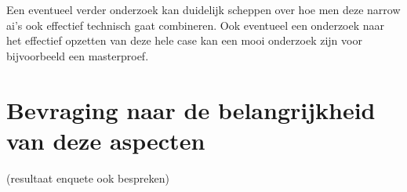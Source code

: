 Een eventueel verder onderzoek kan duidelijk scheppen over hoe men deze narrow ai's ook effectief technisch gaat combineren. Ook eventueel een onderzoek naar het effectief opzetten van deze hele case kan een mooi onderzoek zijn voor bijvoorbeeld een masterproef.

\section{Bevraging naar de belangrijkheid van deze aspecten}

(resultaat enquete ook bespreken)




